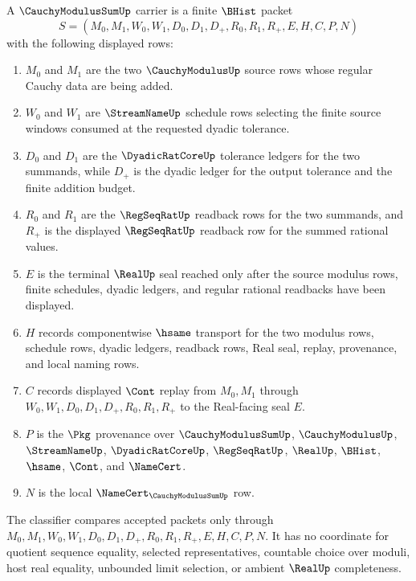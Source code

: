 \begin{definition}
\label{def:cauchy-modulus-sum-carrier}
A $\CauchyModulusSumUp$ carrier is a finite $\BHist$ packet
$$
S=(M_0,M_1,W_0,W_1,D_0,D_1,D_+,R_0,R_1,R_+,E,H,C,P,N)
$$
with the following displayed rows:
\begin{enumerate}
\item $M_0$ and $M_1$ are the two $\CauchyModulusUp$ source rows whose regular Cauchy data are being added.
\item $W_0$ and $W_1$ are $\StreamNameUp$ schedule rows selecting the finite source windows consumed at the requested dyadic tolerance.
\item $D_0$ and $D_1$ are the $\DyadicRatCoreUp$ tolerance ledgers for the two summands, while $D_+$ is the dyadic ledger for the output tolerance and the finite addition budget.
\item $R_0$ and $R_1$ are the $\RegSeqRatUp$ readback rows for the two summands, and $R_+$ is the displayed $\RegSeqRatUp$ readback row for the summed rational values.
\item $E$ is the terminal $\RealUp$ seal reached only after the source modulus rows, finite schedules, dyadic ledgers, and regular rational readbacks have been displayed.
\item $H$ records componentwise $\hsame$ transport for the two modulus rows, schedule rows, dyadic ledgers, readback rows, Real seal, replay, provenance, and local naming rows.
\item $C$ records displayed $\Cont$ replay from $M_0,M_1$ through $W_0,W_1,D_0,D_1,D_+,R_0,R_1,R_+$ to the Real-facing seal $E$.
\item $P$ is the $\Pkg$ provenance over $\CauchyModulusSumUp$, $\CauchyModulusUp$, $\StreamNameUp$, $\DyadicRatCoreUp$, $\RegSeqRatUp$, $\RealUp$, $\BHist$, $\hsame$, $\Cont$, and $\NameCert$.
\item $N$ is the local $\NameCert_{\CauchyModulusSumUp}$ row.
\end{enumerate}
The classifier compares accepted packets only through $M_0,M_1,W_0,W_1,D_0,D_1,D_+,R_0,R_1,R_+,E,H,C,P,N$. It has no coordinate for quotient sequence equality, selected representatives, countable choice over moduli, host real equality, unbounded limit selection, or ambient $\RealUp$ completeness.
\end{definition}

